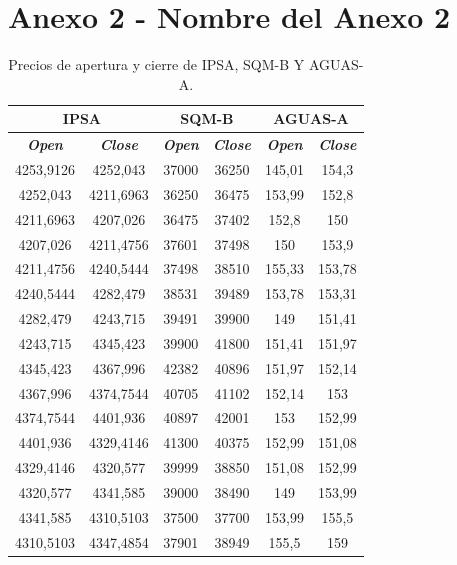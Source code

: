 \documentclass[12pt,letter,spanish]{article}
\begin{document}
\section*{\centering Anexo 2 - Nombre del Anexo 2}
\begin{table}[H]
\renewcommand\thetable{A2.1} 
\small
\caption{Precios de apertura y cierre de IPSA, SQM-B Y AGUAS-A.}
\begin{tabular}{|c|c|c|c|c|c|}
\hline
\multicolumn{2}{|c|}{IPSA}                       & \multicolumn{2}{c|}{SQM-B}                           & \multicolumn{2}{c|}{AGUAS-A}                          \\ \hline
\textit{\textbf{Open}} & \textit{\textbf{Close}} & \textit{\textbf{Open}} & \textit{\textbf{Close}} & \textit{\textbf{Open}} & \textit{\textbf{Close}} \\ \hline
4253,9126 & 4252,043  & 37000 & 36250 & 145,01 & 154,3  \\ \hline
4252,043  & 4211,6963 & 36250 & 36475 & 153,99 & 152,8  \\ \hline
4211,6963 & 4207,026  & 36475 & 37402 & 152,8  & 150    \\ \hline
4207,026  & 4211,4756 & 37601 & 37498 & 150    & 153,9  \\ \hline
4211,4756 & 4240,5444 & 37498 & 38510 & 155,33 & 153,78 \\ \hline
4240,5444 & 4282,479  & 38531 & 39489 & 153,78 & 153,31 \\ \hline
4282,479  & 4243,715  & 39491 & 39900 & 149    & 151,41 \\ \hline
4243,715  & 4345,423  & 39900 & 41800 & 151,41 & 151,97 \\ \hline
4345,423  & 4367,996  & 42382 & 40896 & 151,97 & 152,14 \\ \hline
4367,996  & 4374,7544 & 40705 & 41102 & 152,14 & 153    \\ \hline
4374,7544 & 4401,936  & 40897 & 42001 & 153    & 152,99 \\ \hline
4401,936  & 4329,4146 & 41300 & 40375 & 152,99 & 151,08 \\ \hline
4329,4146 & 4320,577  & 39999 & 38850 & 151,08 & 152,99 \\ \hline
4320,577  & 4341,585  & 39000 & 38490 & 149    & 153,99 \\ \hline
4341,585  & 4310,5103 & 37500 & 37700 & 153,99 & 155,5  \\ \hline
4310,5103 & 4347,4854 & 37901 & 38949 & 155,5  & 159    \\ \hline

\end{tabular}
\end{table}
\end{document}
